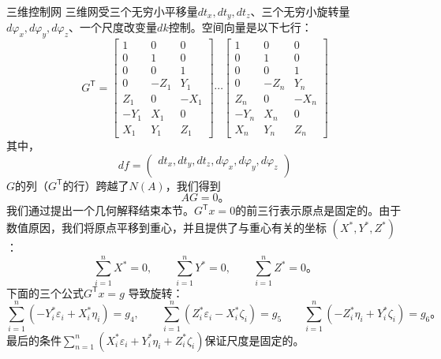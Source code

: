 三维控制网 三维网受三个无穷小平移量$dt_x,dt_y,dt_z$、三个无穷小旋转量$d\varphi_x,d\varphi_y,d\varphi_z$、一个尺度改变量$dk$控制。空间向量是以下七行：
\begin{equation}
	G^\mathsf{T}
	=
	\begin{bmatrix}
		1 & 0 & 0 \\
		0 & 1 & 0 \\
		0 & 0 & 1 \\
		0 & -Z_1 & Y_1 \\
		Z_1 & 0 & -X_1 \\
		-Y_1 & X_1 & 0 \\
		X_1 & Y_1 & Z_1
	\end{bmatrix}
	\cdots
	\begin{bmatrix}
		1 & 0 & 0 \\
		0 & 1 & 0 \\
		0 & 0 & 1 \\
		0 & -Z_n & Y_n \\
		Z_n & 0 & -X_n\\
		-Y_n & X_n & 0 \\
		X_n & Y_n & Z_n
	\end{bmatrix}
\end{equation}
其中，
\begin{equation}
	df
	=
	\begin{pmatrix}
		dt_x,dt_y,dt_z,d\varphi_x,d\varphi_y,d\varphi_z \\
	\end{pmatrix}
\end{equation}
$G$的列（$G^\mathsf{T}$的行）跨越了$N(A)$，我们得到
\begin{equation}
	AG = 0 \text{。}
\end{equation}
我们通过提出一个几何解释结束本节。$G^\mathsf{T}x = 0$的前三行表示原点是固定的。由于数值原因，我们将原点平移到重心，并且提供了与重心有关的坐标
$(X^\ast,Y^\ast,Z^\ast)$：
\begin{equation*}
	\sum_{i=1}^{n}X^\ast = 0,\qquad\sum_{i=1}^{n}Y^\ast = 0,\qquad\sum_{i=1}^{n}Z^\ast = 0 \text{。}
\end{equation*}
下面的三个公式$G^\mathsf{T}x = g$ 导致旋转：
\begin{equation*}
	\sum_{i=1}^{n}(-Y_{i}^{\ast}\varepsilon_i + X_{i}^{\ast}\eta_i) = g_4,\qquad
	\sum_{i=1}^{n}( Z_{i}^{\ast}\varepsilon_i - X_{i}^{\ast}\zeta_i) = g_5\qquad
	\sum_{i=1}^{n}(-Z_{i}^{\ast}\eta_i        + Y_{i}^{\ast}\zeta_i) = g_6 \text{。}
\end{equation*}
最后的条件$\sum_{n=1}^n(X_{i}^{\ast}\varepsilon_i + Y_{i}^{\ast}\eta_i + Z_{i}^{\ast}\zeta_i)$保证尺度是固定的。
